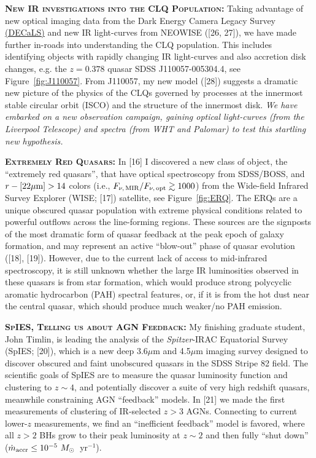 \documentclass[oneside, a4paper, onecolumn, 11pt]{article}
\begin{document}
\smallskip
\smallskip
\noindent
\textbf{\textsc{New IR investigations into the CLQ Population:}}
Taking advantage of new optical imaging data from the Dark Energy
Camera Legacy Survey \href{http://legacysurvey.org/decamls/}{(DECaLS)}
and new IR light-curves from NEOWISE ([26, 27]), we have made further
in-roads into understanding the CLQ population. This includes
identifying objects with rapidly changing IR light-curves and also
accretion disk changes, e.g. the $z=0.378$ quasar SDSS
J110057-005304.4, see Figure~\ref{fig:J110057}. From J110057, my new
model ([28]) suggests a dramatic new picture of the physics of the
CLQs governed by processes at the innermost stable circular orbit
(ISCO) and the structure of the innermost disk. {\it We have embarked
on a new observation campaign, gaining optical light-curves (from the
Liverpool Telescope) and spectra (from WHT and Palomar) to test this
startling new hypothesis.}

\smallskip
\smallskip
\noindent
\textbf{\textsc{Extremely Red Quasars:}}
In [16] I discovered a new class of object, the ``extremely red
quasars'', that have optical spectroscopy from SDSS/BOSS, and
$r-[22\mu{\rm m}]>14$ colors (i.e., $F_{\nu,\, {\rm MIR}} / F_{\nu,\,
{\rm opt}} \gtrsim 1000$) from the Wide-field Infrared Survey Explorer
(WISE; [17]) satellite, see Figure~\ref{fig:ERQ}.  The ERQs are a
unique obscured quasar population with extreme physical conditions
related to powerful outflows across the line-forming regions. These
sources are the signposts of the most dramatic form of quasar feedback
at the peak epoch of galaxy formation, and may represent an active
``blow-out'' phase of quasar evolution ([18], [19]).  However, due to
the current lack of access to mid-infrared spectroscopy, it is still
unknown whether the large IR luminosities observed in these quasars is
from star formation, which would produce strong polycyclic aromatic
hydrocarbon (PAH) spectral features, or, if it is from the hot dust
near the central quasar, which should produce much weaker/no PAH
emission.

\smallskip
\smallskip
\noindent
\textbf{\textsc{SpIES, Telling us about AGN Feedback:}}
My finishing graduate student, John Timlin, is leading the analysis of the {\it
Spitzer}-IRAC Equatorial Survey (SpIES; [20]), which is a new deep
3.6$\mu$m and 4.5$\mu$m imaging survey designed to discover obscured
and faint unobscured quasars in the SDSS Stripe 82 field. The
scientific goals of SpIES are to measure the quasar luminosity
function and clustering to $z\sim4$, and potentially discover a suite
of very high redshift quasars, meanwhile constraining AGN ``feedback''
models.  In [21] we made the first measurements of clustering of
IR-selected $z > 3$ AGNs.  Connecting to current lower-$z$
measurements, we find an ``inefficient feedback'' model is favored,
where all $z>2$ BHs grow to their peak luminosity at $z\sim2$ and then
fully ``shut down'' ($\dot{m}_{\rm accr} \leq 10^{-5}~M_{\odot}$~yr$^{-1}$).
\end{document}
